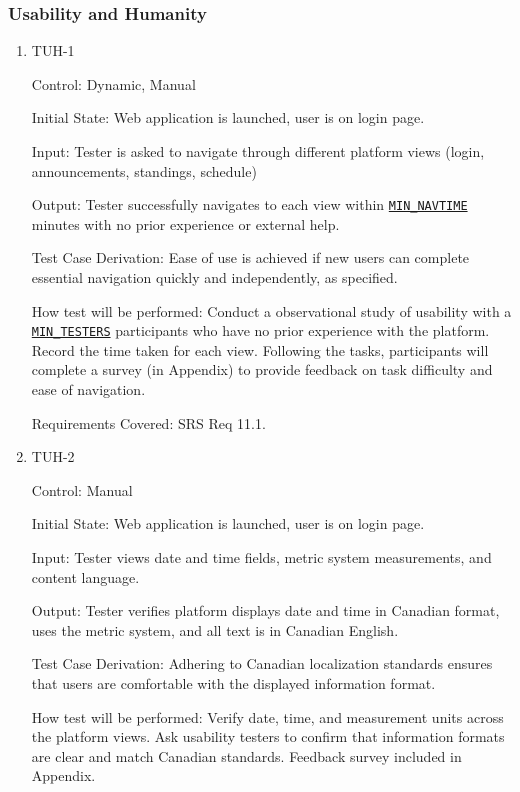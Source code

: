 \documentclass[12pt, titlepage]{article}
\begin{document}
\subsubsection{Usability and Humanity}

\begin{enumerate}

\item{TUH-1\\}

Control: Dynamic, Manual
					
Initial State:  Web application is launched, user is on login page.
					
Input: Tester is asked to navigate through different platform views (login, announcements, standings, schedule)
					
Output: Tester successfully navigates to each view within \hyperref[MIN_NAVTIME]{\texttt{MIN\_NAVTIME}} minutes with no prior experience or external help.

Test Case Derivation: Ease of use is achieved if new users can complete essential navigation quickly and independently, as specified.
					
How test will be performed: Conduct a observational study of usability with a \hyperref[MIN_TESTERS]{\texttt{MIN\_TESTERS}} participants who have no prior experience with the platform. Record the time taken for each view. Following the tasks, participants will complete a survey (in Appendix) to provide feedback on task difficulty and ease of navigation.

Requirements Covered: SRS Req 11.1.

\item{TUH-2\\}

Control: Manual
					
Initial State:  Web application is launched, user is on login page.
					
Input: Tester views date and time fields, metric system measurements, and content language.
					
Output: Tester verifies platform displays date and time in Canadian format, uses the metric system, and all text is in Canadian English.

Test Case Derivation: Adhering to Canadian localization standards ensures that users are comfortable with the displayed information format.
					
How test will be performed: Verify date, time, and measurement units across the platform views. Ask usability testers to confirm that information formats are clear and match Canadian standards. Feedback survey included in Appendix.


\end{enumerate}
\end{document}

